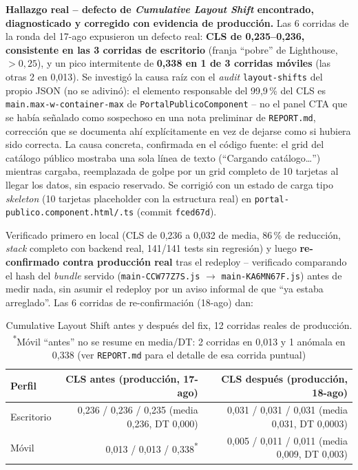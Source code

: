 \textbf{Hallazgo real -- defecto de \emph{Cumulative Layout Shift}
encontrado, diagnosticado y corregido con evidencia de producción.}
Las 6 corridas de la ronda del 17-ago expusieron un defecto real:
\textbf{CLS de 0,235--0,236, consistente en las 3 corridas de
escritorio} (franja ``pobre'' de Lighthouse, $>0,25$), y un pico
intermitente de \textbf{0,338 en 1 de 3 corridas móviles} (las otras 2
en 0,013). Se investigó la causa raíz con el \emph{audit}
\texttt{layout-shifts} del propio JSON (no se adivinó): el elemento
responsable del 99,9\,\% del CLS es \texttt{main.max-w-container-max}
de \texttt{PortalPublicoComponent} -- no el panel CTA que se había
señalado como sospechoso en una nota preliminar de \texttt{REPORT.md},
corrección que se documenta ahí explícitamente en vez de dejarse como
si hubiera sido correcta. La causa concreta, confirmada en el código
fuente: el grid del catálogo público mostraba una sola línea de texto
(``Cargando catálogo\ldots'') mientras cargaba, reemplazada de golpe por
un grid completo de 10 tarjetas al llegar los datos, sin espacio
reservado. Se corrigió con un estado de carga tipo \emph{skeleton} (10
tarjetas placeholder con la estructura real) en
\texttt{portal-publico.component.html/.ts} (commit \texttt{fced67d}).

Verificado primero en local (CLS de 0,236 a 0,032 de media, 86\,\% de
reducción, \emph{stack} completo con backend real, 141/141 tests sin
regresión) y luego \textbf{re-confirmado contra producción real} tras
el redeploy -- verificado comparando el hash del \emph{bundle} servido
(\texttt{main-CCW77Z7S.js} $\to$ \texttt{main-KA6MN67F.js}) antes de
medir nada, sin asumir el redeploy por un aviso informal de que ``ya
estaba arreglado''. Las 6 corridas de re-confirmación (18-ago) dan:

\begin{table}[h]
\centering
\scriptsize
\setlength{\tabcolsep}{2pt}
\begin{tabular}{lrr}
\toprule
Perfil & CLS antes (producción, 17-ago) & CLS después (producción, 18-ago) \\
\midrule
Escritorio & 0,236 / 0,236 / 0,235 (media 0,236, DT 0,000) & 0,031 / 0,031 / 0,031 (media 0,031, DT 0,0003) \\
Móvil & 0,013 / 0,013 / 0,338\textsuperscript{*} & 0,005 / 0,011 / 0,011 (media 0,009, DT 0,003) \\
\bottomrule
\end{tabular}
\caption{Cumulative Layout Shift antes y después del fix, 12 corridas
  reales de producción. \textsuperscript{*}Móvil ``antes'' no se
  resume en media/DT: 2 corridas en 0,013 y 1 anómala en 0,338 (ver
  \texttt{REPORT.md} para el detalle de esa corrida puntual)}
\label{tab:res-cls}
\end{table}

